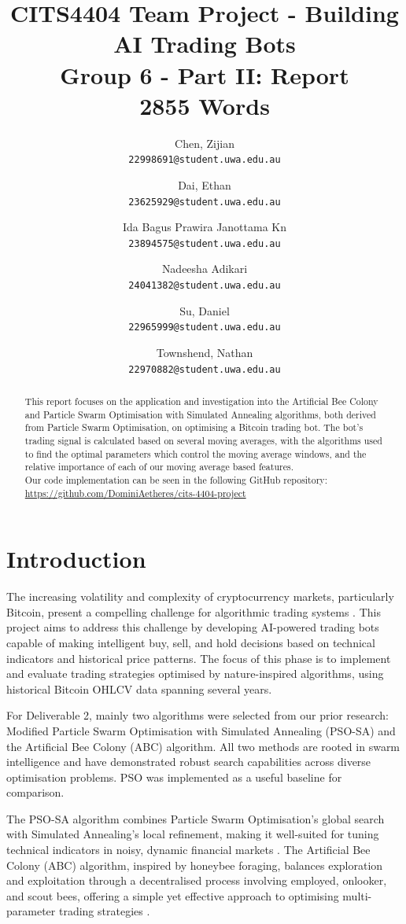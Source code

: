 \documentclass[a4paper, 12pt]{extarticle}
\title{
    CITS4404 Team Project - Building AI Trading Bots
    \\ \large Group 6 - Part II: Report
    \\ 2855 Words
}
\author{
    Chen, Zijian\\
    \normalsize \texttt{22998691@student.uwa.edu.au}
    \and
    Dai, Ethan\\
    \normalsize \texttt{23625929@student.uwa.edu.au}
    \and
    Ida Bagus Prawira Janottama Kn\\
    \normalsize \texttt{23894575@student.uwa.edu.au}
    \and
    Nadeesha Adikari\\
    \normalsize \texttt{24041382@student.uwa.edu.au}
    \and
    Su, Daniel\\
    \normalsize \texttt{22965999@student.uwa.edu.au}
    \and
    Townshend, Nathan\\
    \normalsize \texttt{22970882@student.uwa.edu.au}
}
\date{}
\begin{document}
\maketitle

\begin{abstract}
    \noindent
    This report focuses on the application and investigation into the Artificial Bee Colony and Particle Swarm Optimisation with Simulated Annealing algorithms, both derived from Particle Swarm Optimisation, on optimising a Bitcoin trading bot. The bot's trading signal is calculated based on several moving averages, with the algorithms used to find the optimal parameters which control the moving average windows, and the relative importance of each of our moving average based features.\\
    
    \noindent
    Our code implementation can be seen in the following GitHub repository:\\ \href{https://github.com/DominiAetheres/cits-4404-project}{https://github.com/DominiAetheres/cits-4404-project}
\end{abstract}

\newpage
\tableofcontents

\newpage
\section{Introduction}
The increasing volatility and complexity of cryptocurrency markets, particularly Bitcoin, present a compelling challenge for algorithmic trading systems \cite{dakalbab2024artificial}. This project aims to address this challenge by developing AI-powered trading bots capable of making intelligent buy, sell, and hold decisions based on technical indicators and historical price patterns. The focus of this phase is to implement and evaluate trading strategies optimised by nature-inspired algorithms, using historical Bitcoin OHLCV data spanning several years. 

For Deliverable 2, mainly two algorithms were selected from our prior research:  Modified Particle Swarm Optimisation with Simulated Annealing (PSO-SA) and the Artificial Bee Colony (ABC) algorithm. All two methods are rooted in swarm intelligence and have demonstrated robust search capabilities across diverse optimisation problems. PSO was implemented as a useful baseline for comparison. 

The PSO-SA algorithm combines Particle Swarm Optimisation's global search with Simulated Annealing's local refinement, making it well-suited for tuning technical indicators in noisy, dynamic financial markets \cite{psosa}. The Artificial Bee Colony (ABC) algorithm, inspired by honeybee foraging, balances exploration and exploitation through a decentralised process involving employed, onlooker, and scout bees, offering a simple yet effective approach to optimising multi-parameter trading strategies \cite{abc}. 
\end{document}
